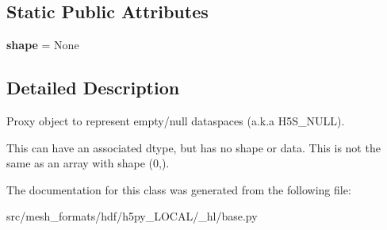 \subsection*{Static Public Attributes}
\begin{DoxyCompactItemize}
\item 
\mbox{\label{classh5py__LOCAL_1_1__hl_1_1base_1_1Empty_a340f29d7e5781b4b828dc54d98324745}} 
{\bfseries shape} = None
\end{DoxyCompactItemize}


\subsection{Detailed Description}
\begin{DoxyVerb}    Proxy object to represent empty/null dataspaces (a.k.a H5S_NULL).

    This can have an associated dtype, but has no shape or data. This is not
    the same as an array with shape (0,).
\end{DoxyVerb}
 

The documentation for this class was generated from the following file\+:\begin{DoxyCompactItemize}
\item 
src/mesh\+\_\+formats/hdf/h5py\+\_\+\+L\+O\+C\+A\+L/\+\_\+hl/base.\+py\end{DoxyCompactItemize}
